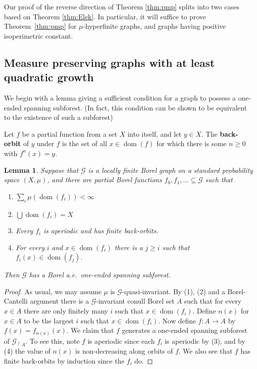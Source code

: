 \documentclass[11pt]{amsart}
\theoremstyle{definition}
\theoremstyle{plain}
\newtheorem{lemma}[definition]{Lemma}
\newcommand{\<}{\langle}
\renewcommand{\>}{\rangle}
\newcommand{\from}{\colon}
\newcommand{\bigunion}{\bigcup}
\DeclareMathOperator{\dom}{dom}
\newcommand{\Ggraph}{\mathcal{G}}
\newcommand{\define}[1]{\textbf{#1}}
\begin{document}
Our proof of the reverse direction of Theorem \ref{thm:pmp} splits into two
cases based on Theorem \ref{thm:Elek}. In particular, it will suffice to
prove Theorem~\ref{thm:pmp} for $\mu$-hyperfinite graphs, and graphs having
positive isoperimetric constant.


\subsection{Measure preserving graphs with at least quadratic growth}\label{sec:growth}

We begin with a lemma giving a sufficient condition for a graph to possess
a one-ended spanning subforest. (In fact, this condition can be shown to be
equivalent to the existence of such a subforest)

Let $f$ be a partial function from a set $X$ into itself, and let $y\in X$. The \define{back-orbit} of $y$ under $f$ is the set of all $x\in \dom(f)$ for which there is some $n\geq 0$ with $f^n(x)=y$.

\begin{lemma}\label{abstract_clinton}
  Suppose that ${\Ggraph}$ is a locally finite Borel graph on a standard
  probability space $(X,\mu)$, and there are partial Borel functions $f_0,
  f_1, \ldots \subseteq {\Ggraph}$ such that
  \begin{enumerate}
    \item $\sum_{i} \mu(\dom(f_i)) < \infty$
    \item $\bigunion \dom(f_i) = X$
    \item Every $f_i$ is aperiodic and has finite back-orbits.
    \item For every $i$ and $x \in \dom(f_i)$ there is a $j \geq i$ such
    that $f_i(x) \in \dom(f_j)$.
  \end{enumerate}
  Then ${\Ggraph}$ has a Borel a.e.\ one-ended spanning subforest.
\end{lemma}
\begin{proof}
  As usual, we may assume $\mu$ is ${\Ggraph}$-quasi-invariant.
   By (1), (2) and a
  Borel-Cantelli argument there is a ${\Ggraph}$-invariant conull Borel set $A$
  such that for every $x \in A$ there are only finitely many $i$ such that
  $x \in \dom(f_i)$. Define $n(x)$ for $x \in A$ to be the
  largest $i$ such that $x \in \dom(f_i)$. Now define $f \from A \to A$ by
  $f(x) = f_{n(x)}(x)$. We claim that $f$ generates
  a one-ended spanning subforest of ${\Ggraph}_{\restriction A}$.
  To see this, note $f$ is aperiodic since each $f_i$ is aperiodic by (3),
  and by (4) the value of $n(x)$ is non-decreasing along orbits of $f$. We also
  see that $f$ has finite back-orbits by induction since the $f_i$ do.
\end{proof}
\end{document}
